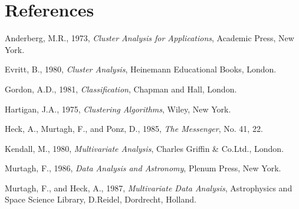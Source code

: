 \section{References}
\begin{refs}
\item Anderberg, M.R., 1973, {\it Cluster Analysis for Applications},
  Academic Press, New York.
\item Evritt, B., 1980, {\it Cluster Analysis}, Heinemann Educational Books, 
  London.
\item Gordon, A.D., 1981, {\it Classification}, Chapman and Hall, London.
\item Hartigan, J.A., 1975, {\it Clustering Algorithms}, Wiley, New York.
\item Heck, A., Murtagh, F., and Ponz, D., 1985, {\it The Messenger},
  No. 41, 22.
\item Kendall, M., 1980, {\it Multivariate Analysis}, Charles Griffin \& 
  Co.Ltd., London.
\item Murtagh, F., 1986, {\it Data Analysis and Astronomy}, Plenum Press,
  New York.
\item Murtagh, F., and Heck, A., 1987, {\it Multivariate Data Analysis},
  Astrophysics and Space Science Library, D.Reidel, Dordrecht, Holland.
\end{refs}

